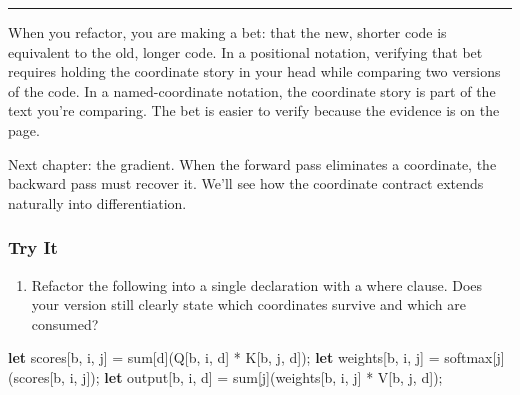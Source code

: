 \documentclass[11pt,]{article}
\newenvironment{Shaded}{}{}
\newcommand{\KeywordTok}[1]{\textcolor[rgb]{0.00,0.44,0.13}{\textbf{#1}}}
\newcommand{\NormalTok}[1]{#1}
\newcommand{\OperatorTok}[1]{\textcolor[rgb]{0.40,0.40,0.40}{#1}}
\providecommand{\tightlist}{%
  \setlength{\itemsep}{0pt}\setlength{\parskip}{0pt}}
\begin{document}
\begin{center}\rule{0.5\linewidth}{0.4pt}\end{center}

When you refactor, you are making a bet: that the new, shorter code is
equivalent to the old, longer code. In a positional notation, verifying
that bet requires holding the coordinate story in your head while
comparing two versions of the code. In a named-coordinate notation, the
coordinate story is part of the text you're comparing. The bet is easier
to verify because the evidence is on the page.

Next chapter: the gradient. When the forward pass eliminates a
coordinate, the backward pass must recover it. We'll see how the
coordinate contract extends naturally into differentiation.

\hypertarget{try-it-6}{%
\subsubsection{Try It}\label{try-it-6}}

\begin{enumerate}
\def\labelenumi{\arabic{enumi}.}
\tightlist
\item
  Refactor the following into a single declaration with a where clause.
  Does your version still clearly state which coordinates survive and
  which are consumed?
\end{enumerate}

\begin{Shaded}
\begin{Highlighting}[]
\KeywordTok{let}\NormalTok{ scores}\OperatorTok{[}\NormalTok{b, i, j}\OperatorTok{]}\NormalTok{ = sum}\OperatorTok{[}\NormalTok{d}\OperatorTok{]}\NormalTok{(Q}\OperatorTok{[}\NormalTok{b, i, d}\OperatorTok{]}\NormalTok{ * K}\OperatorTok{[}\NormalTok{b, j, d}\OperatorTok{]}\NormalTok{);}
\KeywordTok{let}\NormalTok{ weights}\OperatorTok{[}\NormalTok{b, i, j}\OperatorTok{]}\NormalTok{ = softmax}\OperatorTok{[}\NormalTok{j}\OperatorTok{]}\NormalTok{(scores}\OperatorTok{[}\NormalTok{b, i, j}\OperatorTok{]}\NormalTok{);}
\KeywordTok{let}\NormalTok{ output}\OperatorTok{[}\NormalTok{b, i, d}\OperatorTok{]}\NormalTok{ = sum}\OperatorTok{[}\NormalTok{j}\OperatorTok{]}\NormalTok{(weights}\OperatorTok{[}\NormalTok{b, i, j}\OperatorTok{]}\NormalTok{ * V}\OperatorTok{[}\NormalTok{b, j, d}\OperatorTok{]}\NormalTok{);}
\end{Highlighting}
\end{Shaded}
\end{document}
